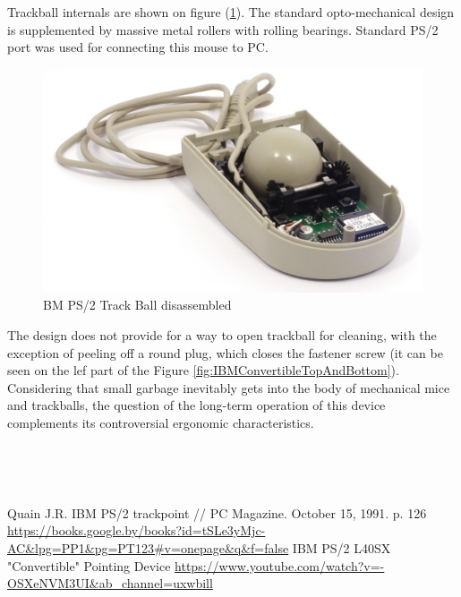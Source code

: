 \documentclass[11pt, a4paper]{article}
\begin{document}
Trackball internals are shown on figure (\ref{fig:IBMConvertibleInside}). The standard opto-mechanical design is supplemented by massive metal rollers with rolling bearings. Standard PS/2 port was used for connecting this mouse to PC.

\begin{figure}[h]
    \centering
    \includegraphics[scale=0.7]{1992_ibm_convertible/inside_60.jpg}
    \caption{BM PS/2 Track Ball disassembled}
    \label{fig:IBMConvertibleInside}
\end{figure}

The design does not provide for a way to open trackball for cleaning, with the exception of peeling off a round plug, which closes the fastener screw (it can be seen on the lef part of the Figure \ref{fig:IBMConvertibleTopAndBottom}). Considering that small garbage inevitably gets into the body of mechanical mice and trackballs, the question of the long-term operation of this device complements its controversial ergonomic characteristics.

~

~

\begin{thebibliography}{9}
 Quain J.R. IBM PS/2 trackpoint // PC Magazine. October 15, 1991. p. 126 \url{https://books.google.by/books?id=tSLe3yMjc-AC&lpg=PP1&pg=PT123#v=onepage&q&f=false}
 IBM PS/2 L40SX "Convertible" Pointing Device \url{https://www.youtube.com/watch?v=-OSXeNVM3UI&ab_channel=uxwbill}
\end{thebibliography}
\end{document}
